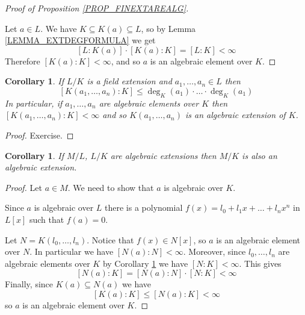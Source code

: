 \documentclass[12pt, letterpaper, oneside]{article}
\theoremstyle{plain}
\newtheorem{corollary}[theorem]{Corollary}
\theoremstyle{definition}
\newcommand{\vs}{\vskip 5mm}
\begin{document}
\vs\vs

\begin{proof}[Proof of Proposition \ref{PROP_FINEXTAREALG}]  \ 

Let  $a\in L$. We have $K \subseteq K(a) \subseteq L$, so by Lemma 
\ref{LEMMA_EXTDEGFORMULA} we get 
$$[L:K(a)]\cdot [K(a): K] = [L:K] < \infty$$
Therefore $[K(a):K] < \infty$, and so $a$ is an algebraic element over $K$.

\end{proof}



\vs\vs


\begin{corollary}
\label{COR_FINSETFIELDEXT}
If $L/K$ is a field extension and $a_{1}, \dots, a_{n}\in L$ then 
$$[K(a_{1}, \dots, a_{n}) : K ] \leq \deg_{K}(a_{1})\cdot {\dots}\cdot \deg_{K}(a_{1})$$
In particular, if $a_{1}, \dots, a_{n}$ are algebraic elements over $K$ then  
$[K(a_{1}, \dots, a_{n}): K] < \infty$ and so $K(a_{1}, \dots , a_{n})$ is an algebraic extension 
of $K$.
\end{corollary}

\vs

\begin{proof}
Exercise. 
\end{proof}



\vs\vs


\begin{corollary}
\label{COR_COMPALGEXT}
If $M/L$, $L/K$ are algebraic extensions then $M/K$ is also an algebraic extension. 
\end{corollary}


\vs 

\begin{proof}
Let $a\in M$. We need to show that $a$ is algebraic over $K$. 

Since $a$ is algebraic over $L$ there is a polynomial 
$f(x) = l_{0} + l_{1}x + {\dots} + l_{n}x^{n}$ in $L[x]$ such that $f(a) = 0$. 

Let $N = K(l_{0}, \dots, l_{n})$. Notice that $f(x)\in N[x]$, so $a$ is an algebraic element 
over $N$. In particular we have $[N(a): N] < \infty$. Moreover, since $l_{0}, \dots, l_{n}$
are algebraic elements over $K$ by Corollary \ref{COR_FINSETFIELDEXT} we have 
$[N:K] <\infty$. This gives 
$$[N(a):K] = [N(a):N]\cdot [N:K] < \infty$$
Finally, since $K(a)\subseteq N(a)$ we have 
$$[K(a): K] \leq [N(a): K] < \infty$$
so $a$ is an algebraic element over $K$.  
\end{proof}
\end{document}
